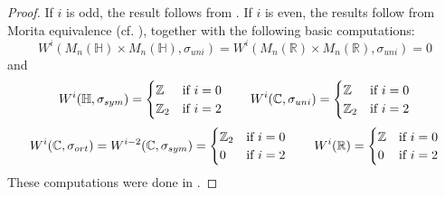 \documentclass[psamsfonts]{amsart}
\theoremstyle{plain}
\theoremstyle{theorem}
\theoremstyle{definition}
\newcommand{\R}{\mathbb{R}}
\newcommand{\Z}{\mathbb{Z}}
\newcommand{\W}{W}
\begin{document}
	\begin{proof}
		If $i$ is odd, the result follows from \cite[Theorem 5.2]{DR87}. If $i$ is even, the results follow from Morita equivalence (cf. \cite[Section I.8]{Knus}), together with the following basic computations:
 	\[ \W^i(M_n(\mathbb{H}) \times M_n(\mathbb{H}), \sigma_{uni}) =	\W^i( M_n(\R) \times M_n(\R), \sigma_{uni}) = 0  \]
 	and
	\[ \W^i(\mathbb{H}, \sigma_{sym}) =	\begin{cases}
			\Z & \textnormal{if $i =0$} \\
			\Z_2 & \textnormal{if $i=2$}
		\end{cases} 
		\quad   \quad 
		\W^i(\mathbb{C}, \sigma_{uni}) =	\begin{cases}
		\Z & \textnormal{if $i =0$} \\
		\Z_2 & \textnormal{if $i=2$}
		\end{cases} \]
	\[ \W^{i}(\mathbb{C}, \sigma_{ort}) = \W^{i-2}(\mathbb{C},\sigma_{sym})	= \begin{cases}
	\Z_2 & \textnormal{if $i =0$} \\
    0	 & \textnormal{if $i=2$}
\end{cases}  \quad \quad 
\W^i(\mathbb{R}) = \begin{cases}
	\mathbb{Z} & \textrm{if $i = 0$} \\
	0  & \textnormal{if $i =2 $}
\end{cases}
\]
These computations were done in \cite[Section I.9]{Knus}.  
	\end{proof}
	
\end{document}
